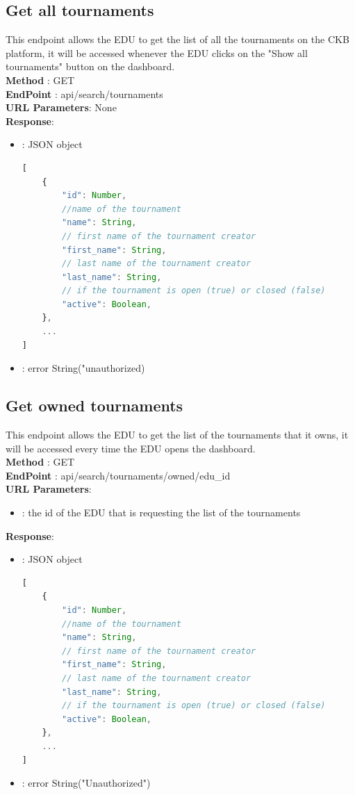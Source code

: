 \subsection*{Get all tournaments}
This endpoint allows the EDU to get the list of all the tournaments on the CKB platform, it will be accessed whenever the EDU clicks on the "Show all tournaments" button on the dashboard.\\
\textbf{Method} : GET \\
\textbf{EndPoint} : api/search/tournaments \\
\textbf{URL Parameters}: None \\
\textbf{Response}:
\begin{itemize}
    \item {} : JSON object
          \begin{lstlisting}[language=JavaScript, label={lst:jscode}, basicstyle=\ttfamily]
[
    {
        "id": Number,
        //name of the tournament
        "name": String,
        // first name of the tournament creator
        "first_name": String, 
        // last name of the tournament creator
        "last_name": String,
        // if the tournament is open (true) or closed (false)
        "active": Boolean,
    },
    ...
]
        \end{lstlisting}
    \item {}: error String("unauthorized)
\end{itemize}

\subsection*{Get owned tournaments}
This endpoint allows the EDU to get the list of the tournaments that it owns, it will be accessed every time the EDU opens the dashboard.\\

\textbf{Method} : GET \\
\textbf{EndPoint} : api/search/tournaments/owned/{edu\_id} \\
\textbf{URL Parameters}:
\begin{itemize}
    \item {}: the id of the EDU that is requesting the list of the tournaments
\end{itemize}
\textbf{Response}:
\begin{itemize}
    \item {} : JSON object
          \begin{lstlisting}[language=JavaScript, label={lst:jscode}, basicstyle=\ttfamily]
[
    {
        "id": Number,
        //name of the tournament
        "name": String,
        // first name of the tournament creator
        "first_name": String, 
        // last name of the tournament creator
        "last_name": String,
        // if the tournament is open (true) or closed (false)
        "active": Boolean,
    },
    ...
]
            \end{lstlisting}
    \item {} : error String("Unauthorized")
\end{itemize}

